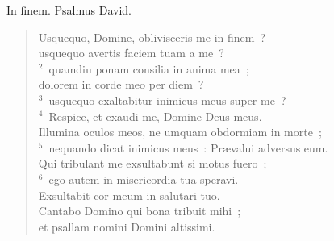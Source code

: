 \lettrine[lines=3,image=true,loversize=0.05,lraise=-0.03]{I}{}n finem. Psalmus David. \begin{flushleft}\begin{verse}\vspace{6pt}Usquequo, Domine, oblivisceris me in finem~?\\ usquequo avertis faciem tuam a me~?\\
${}^{2}$~quamdiu ponam consilia in anima mea~;\\ dolorem in corde meo per diem~?\\
${}^{3}$~usquequo exaltabitur inimicus meus super me~?\\
${}^{4}$~Respice, et exaudi me, Domine Deus meus.\\ Illumina oculos meos, ne umquam obdormiam in morte~;\\
${}^{5}$~nequando dicat inimicus meus~: Pr\ae valui adversus eum.\\ Qui tribulant me exsultabunt si motus fuero~;\\
${}^{6}$~ego autem in misericordia tua speravi.\\ Exsultabit cor meum in salutari tuo.\\ Cantabo Domino qui bona tribuit mihi~;\\ et psallam nomini Domini altissimi.\end{verse}\end{flushleft}



